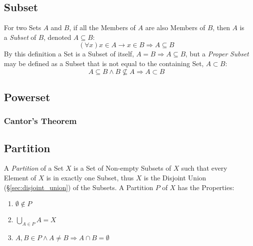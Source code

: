 \subsection{Subset}\label{sec:subset}

For two Sets $A$ and $B$, if all the Members of $A$ are also Members
of $B$, then $A$ is a \emph{Subset} of $B$, denoted $A \subseteq B$:
\[
  (\forall x) x \in A \rightarrow x \in B \Rightarrow A \subseteq B
\]
By this definition a Set is a Subset of itself, $A = B \Rightarrow A
\subseteq B$, but a \emph{Proper Subset} may be defined as a Subset
that is not equal to the containing Set, $A \subset B$:
\[
  A \subseteq B \wedge B \nsubseteq A \Rightarrow A \subset B
\]



\subsection{Powerset}\label{sec:powerset}

\subsubsection{Cantor's Theorem}\label{sec:cantors_theorem}



\subsection{Partition}\label{sec:set_partition}

A \emph{Partition} of a Set $X$ is a Set of Non-empty Subsets of $X$
such that every Element of $X$ is in exactly one Subset, thus $X$ is
the Disjoint Union (\S\ref{sec:disjoint_union}) of the Subsets. A
Partition $P$ of $X$ has the Properties:
\begin{enumerate}
  \item $\emptyset \notin P$
  \item $\bigcup_{A \in P}A = X$
  \item $A,B \in P \wedge A \neq B \Rightarrow A \cap B = \emptyset$
\end{enumerate}



